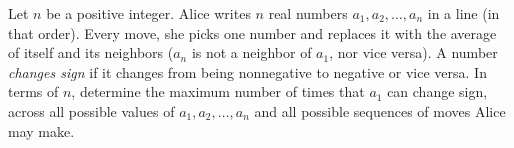 Let $n$ be a positive integer. Alice writes $n$ real numbers $a_1, a_2,\dots, a_n$ in a line (in that order). Every move, she picks one number and replaces it with the average of itself and its neighbors ($a_n$ is not a neighbor of $a_1$, nor vice versa). A number \textit{changes sign} if it changes from being nonnegative to negative or vice versa. In terms of $n$, determine the maximum number of times that $a_1$ can change sign, across all possible values of $a_1,a_2,\dots, a_n$ and all possible sequences of moves Alice may make.